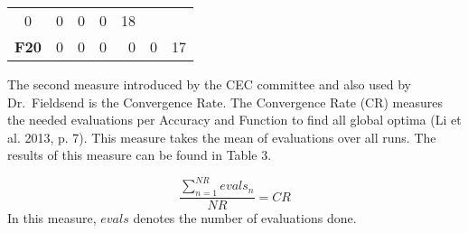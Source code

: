 \documentclass[12pt,a4paper]{article}
\begin{document}
\begin{longtable}[c]{@{}crrrrrr@{}}
\begin{minipage}[t]{0.08\columnwidth}
0
\strut\end{minipage} &
\begin{minipage}[t]{0.09\columnwidth}\raggedleft\strut
0
\strut\end{minipage} &
\begin{minipage}[t]{0.10\columnwidth}\raggedleft\strut
0
\strut\end{minipage} &
\begin{minipage}[t]{0.11\columnwidth}\raggedleft\strut
0
\strut\end{minipage} &
\begin{minipage}[t]{0.07\columnwidth}\raggedleft\strut
18
\strut\end{minipage}\tabularnewline
\begin{minipage}[t]{0.11\columnwidth}\centering\strut
\textbf{F20}
\strut\end{minipage} &
\begin{minipage}[t]{0.07\columnwidth}\raggedleft\strut
0
\strut\end{minipage} &
\begin{minipage}[t]{0.08\columnwidth}\raggedleft\strut
0
\strut\end{minipage} &
\begin{minipage}[t]{0.09\columnwidth}\raggedleft\strut
0
\strut\end{minipage} &
\begin{minipage}[t]{0.10\columnwidth}\raggedleft\strut
0
\strut\end{minipage} &
\begin{minipage}[t]{0.11\columnwidth}\raggedleft\strut
0
\strut\end{minipage} &
\begin{minipage}[t]{0.07\columnwidth}\raggedleft\strut
17
\strut\end{minipage}\tabularnewline
\bottomrule
\end{longtable}

The second measure introduced by the CEC committee and also used by
Dr.~Fieldsend is the Convergence Rate. The Convergence Rate (CR)
measures the needed evaluations per Accuracy and Function to find all
global optima (Li et al. 2013, p. 7). This measure takes the mean of
evaluations over all runs. The results of this measure can be found in
Table 3.

\[\frac{\sum\nolimits_{n=1}^{NR} evals_{n}}{NR} = CR\] In this measure,
\(evals\) denotes the number of evaluations done. \newline
\end{document}
